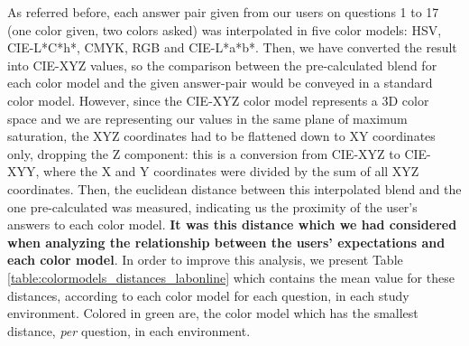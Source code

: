 %
As referred before, each answer pair given from our users on questions 1 to 17 (one color given, two colors asked) was interpolated in five color models:
HSV, CIE-L*C*h*, CMYK, RGB and CIE-L*a*b*. Then, we have converted the result into CIE-XYZ values, so the comparison between the pre-calculated blend for
each color model and the given answer-pair would be conveyed in a standard color model. However, since the CIE-XYZ color model represents a 3D color space
and we are representing our values in the same plane of maximum saturation, the XYZ coordinates had to be flattened down to XY coordinates only, dropping
the Z component: this is a conversion from CIE-XYZ to CIE-XYY, where the X and Y coordinates were divided by the sum of all XYZ coordinates. Then, the
euclidean distance between this interpolated blend and the one pre-calculated was measured, indicating us the proximity of the user's answers to each
color model. \textbf{It was this distance which we had considered when analyzing the relationship between the users' expectations and each color model}.
In order to improve this analysis, we present Table \ref{table:colormodels_distances_labonline} which contains the mean value for these distances,
according to each color model for each question, in each study environment. Colored in green are, the color model which has the
smallest distance, \emph{per} question, in each environment. \par
%
%
